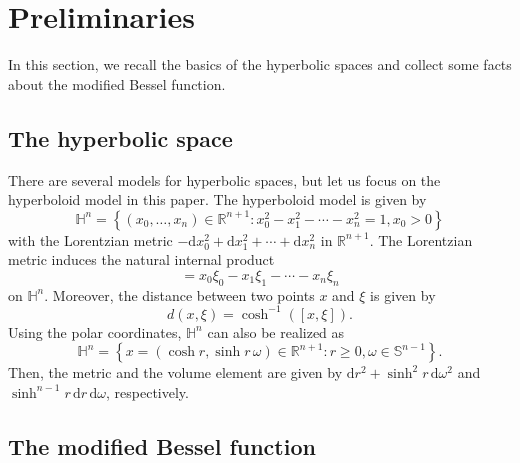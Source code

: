 \documentclass[11pt]{amsart}
\theoremstyle{plain}
\theoremstyle{definition}
\numberwithin{equation}{section}
\begin{document}

\section{Preliminaries} \label{sec:preliminaries}


In this section, we recall the basics of the hyperbolic spaces and collect some facts about the modified Bessel function.

\subsection{The hyperbolic space}

There are several models for hyperbolic spaces, but let us focus on the hyperboloid model in this paper. The hyperboloid model is given by
\begin{equation*}
\mathbb{H}^{n} = \left\lbrace (x_{0}, \dots, x_{n}) \in \mathbb{R}^{n+1}: x_{0}^{2}-x_{1}^{2}-\cdots-x_{n}^{2} = 1, x_{0} > 0 \right\rbrace
\end{equation*}
with the Lorentzian metric $-\mathrm{d} x_{0}^{2}+\mathrm{d} x_{1}^{2}+\cdots+ \mathrm{d} x_{n}^{2}$ in $\mathbb{R}^{n+1}$. The Lorentzian metric induces the natural internal product
\begin{equation*}
[x, \xi] = x_{0} \xi_{0} - x_{1} \xi_{1} - \cdots - x_{n} \xi_{n}
\end{equation*}
on $\mathbb{H}^{n}$. Moreover, the distance between two points $x$ and $\xi$ is given by
\begin{equation*}
d(x, \xi) = \cosh^{-1}([x, \xi]).
\end{equation*}
Using the polar coordinates, $\mathbb{H}^{n}$ can also be realized as
\begin{equation*}
\mathbb{H}^{n} = \left\lbrace x=(\cosh r, \sinh r \, \omega) \in \mathbb{R}^{n+1}: r \geq 0, \omega \in \mathbb{S}^{n-1} \right\rbrace.
\end{equation*}
Then, the metric and the volume element are given by $\mathrm{d} r^{2} + \sinh^2 r \, \mathrm{d} \omega^{2}$ and $\sinh^{n-1} r \, \mathrm{d} r \, \mathrm{d} \omega$, respectively. 

\subsection{The modified Bessel function} \label{sec:Bessel}
\end{document}
